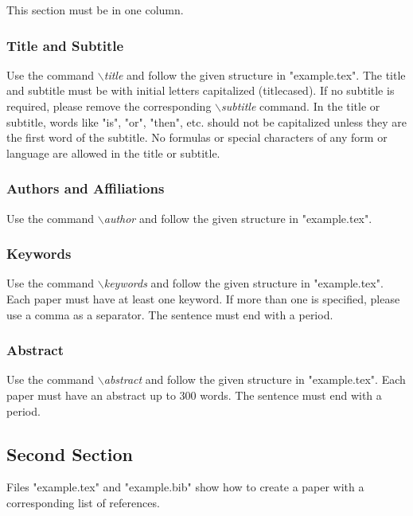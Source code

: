 \documentclass[a4paper,twoside]{article}
\begin{document}
\noindent This section must be in one column.

\vfill
\subsubsection{Title and Subtitle}

\noindent Use the command \textit{$\backslash$title} and follow the given structure in "example.tex". The title and subtitle must be with initial letters
capitalized (titlecased). If no subtitle is required, please remove the corresponding \textit{$\backslash$subtitle} command. In the title or subtitle, words like "is", "or", "then", etc. should not be capitalized unless they are the first word of the subtitle. No formulas or special characters of any form or language are allowed in the title or subtitle.

\subsubsection{Authors and Affiliations}

\noindent Use the command \textit{$\backslash$author} and follow the given structure in "example.tex".

\subsubsection{Keywords}

\noindent Use the command \textit{$\backslash$keywords} and follow the given structure in "example.tex". Each paper must have at least one keyword. If more than one is specified, please use a comma as a separator. The sentence must end with a period.

\subsubsection{Abstract}

\noindent Use the command \textit{$\backslash$abstract} and follow the given structure in "example.tex".
Each paper must have an abstract up to 300 words. The sentence
must end with a period.

\subsection{Second Section}

\noindent Files "example.tex" and "example.bib" show how to create a paper with a 
corresponding list of references.
\end{document}
